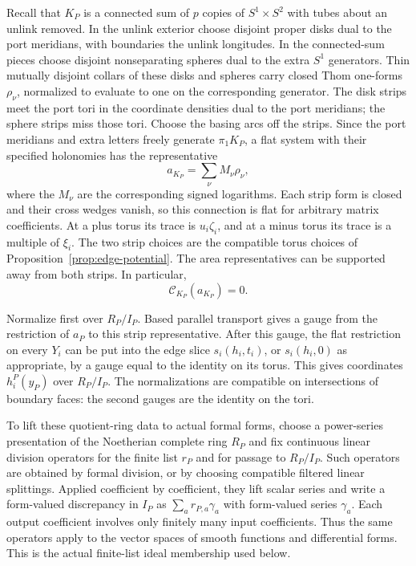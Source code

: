 Recall that $K_P$ is a connected sum of $p$ copies of $S^1\times S^2$
with tubes about an unlink removed.  In the unlink exterior choose
disjoint proper disks dual to the port meridians, with boundaries the
unlink longitudes.  In the connected-sum pieces choose disjoint
nonseparating spheres dual to the extra $S^1$ generators.  Thin mutually
disjoint collars of these disks and spheres carry closed Thom
one-forms $\rho_\nu$, normalized to evaluate to one on the corresponding
generator.  The disk strips meet the port tori in the coordinate
densities dual to the port meridians; the sphere strips miss those tori.
Choose the basing arcs off the strips.  Since the port meridians and
extra letters freely generate $\pi_1K_P$, a flat system with their
specified holonomies has the representative
\[
 a_{K_P}=\sum_\nu M_\nu\rho_\nu,
\]
where the $M_\nu$ are the corresponding signed logarithms.  Each strip
form is closed and their cross wedges vanish, so this connection is
flat for arbitrary matrix coefficients.
At a plus torus its trace is $u_i\zeta_i$, and at a minus torus its trace
is a multiple of $\xi_i$.  The two strip choices are the compatible
torus choices of Proposition~\ref{prop:edge-potential}.  The area
representatives can be supported away from both strips.  In particular,
\begin{equation}
\label{eq:vertex-k-cs-zero}
 \mathcal C_{K_P}(a_{K_P})=0.
\end{equation}

Normalize first over $R_P/I_P$.  Based parallel transport gives a gauge
from the restriction of $a_P$ to this strip representative.  After this gauge,
the flat restriction on every $Y_i$ can be put into the edge slice
$s_i(h_i,t_i)$, or $s_i(h_i,0)$ as appropriate, by a gauge equal to the
identity on its torus.  This gives coordinates $h_i^P(y_P)$ over
$R_P/I_P$.  The normalizations are compatible on intersections of
boundary faces: the second gauges are the identity on the tori.

To lift these quotient-ring data to actual formal forms, choose a
power-series presentation of the Noetherian complete ring $R_P$ and
fix continuous linear division operators
for the finite list $r_P$ and for passage to $R_P/I_P$.  Such operators
are obtained by formal division, or by choosing compatible filtered
linear splittings.  Applied coefficient by coefficient, they lift
scalar series and write a form-valued discrepancy in $I_P$ as
$\sum_a r_{P,a}\gamma_a$ with form-valued series $\gamma_a$.
Each output coefficient involves only finitely many input coefficients.
Thus the same operators apply to the vector spaces of smooth functions
and differential forms.  This is the actual finite-list ideal
membership used below.

